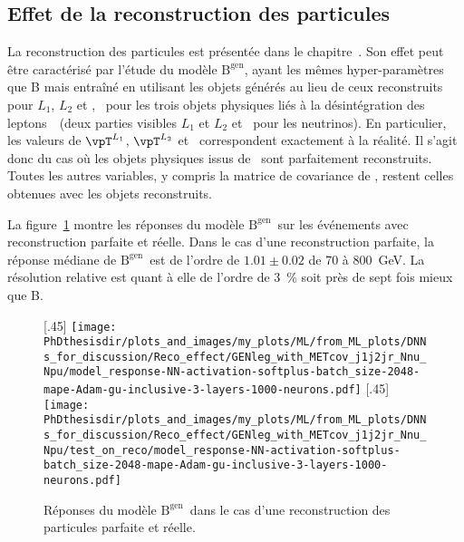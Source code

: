 \subsection{Effet de la reconstruction des particules}
\def\Bgenleg{$\text{B}^\text{gen}$}
La reconstruction des particules est présentée dans le chapitre~.
Son effet peut être caractérisé par l'étude du modèle \Bgenleg,
ayant les mêmes hyper-paramètres que B mais entraîné en utilisant les objets générés au lieu de ceux reconstruits pour $L_1$, $L_2$ et \MET, \ie\ pour les trois objets physiques liés à la désintégration des leptons~\tau\ (deux parties visibles $L_1$ et $L_2$ et \MET\ pour les neutrinos).
En particulier, les valeurs de $\vpT^{L_1}$, $\vpT^{L_2}$ et \vMET\ correspondent exactement à la réalité.
Il s'agit donc du cas où les objets physiques issus de \higgsML\ sont parfaitement reconstruits.
Toutes les autres variables, y compris la matrice de covariance de \MET, restent celles obtenues avec les objets reconstruits.
\par
La figure~\ref{fig-reponse_model_1GENleg} montre les réponses du modèle \Bgenleg\ sur les événements avec reconstruction parfaite et réelle.
Dans le cas d'une reconstruction parfaite,
la réponse médiane de \Bgenleg\ est de l'ordre de $\num{1.01}\pm\num{0.02}$ de \num{70} à \SI{800}{\GeV}.
La résolution relative est quant à elle de l'ordre de \SI{3}{\%} soit près de sept fois mieux que B.
\begin{figure}[h]
\centering

[.45\textwidth]
{\texttt{[image: \\PhDthesisdir/plots\_and\_images/my\_plots/ML/from\_ML\_plots/DNNs\_for\_discussion/Reco\_effect/GENleg\_with\_METcov\_j1j2jr\_Nnu\_Npu/model\_response-NN-activation-softplus-batch\_size-2048-mape-Adam-gu-inclusive-3-layers-1000-neurons.pdf]}\vspace{-.5\baselineskip}}
\hfill
{}[.45\textwidth]
{\texttt{[image: \\PhDthesisdir/plots\_and\_images/my\_plots/ML/from\_ML\_plots/DNNs\_for\_discussion/Reco\_effect/GENleg\_with\_METcov\_j1j2jr\_Nnu\_Npu/test\_on\_reco/model\_response-NN-activation-softplus-batch\_size-2048-mape-Adam-gu-inclusive-3-layers-1000-neurons.pdf]}\vspace{-.5\baselineskip}}

\caption[Réponses du modèle \Bgenleg\ avec reconstruction parfaite ou réelle.]{Réponses du modèle \Bgenleg\ dans le cas d'une reconstruction des particules parfaite et réelle.}
\label{fig-reponse_model_1GENleg}
\end{figure}
